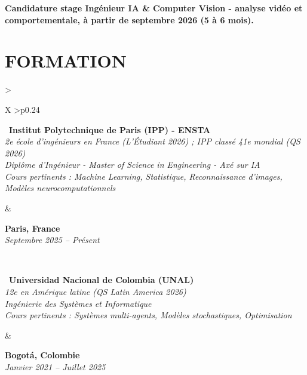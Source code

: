 \documentclass[letterpaper,10pt]{article}
\begin{document}
\textbf{Candidature stage Ingénieur IA \& Computer Vision - analyse vidéo et comportementale, à partir de septembre 2026 (5 à 6 mois).} 


\vspace{-0.05cm}

\section{\textcolor{mydarkgreen}{\textbf{FORMATION}}}

\begin{tabularx}{\textwidth}{>{\raggedright\arraybackslash}X >{\raggedleft\arraybackslash}p{0.24\textwidth}}
  \begin{minipage}[t]{\linewidth}\raggedright
  \textbullet\ \textbf{Institut Polytechnique de Paris (IPP) - ENSTA}\\
  \textit{\footnotesize 2e école d'ingénieurs en France (L'Étudiant 2026) ; IPP classé 41e mondial (QS 2026)}\\
  \textit{\footnotesize Diplôme d'Ingénieur - Master of Science in Engineering - Axé sur IA}\\
  \textit{\footnotesize Cours pertinents : Machine Learning, Statistique, Reconnaissance d'images, Modèles neurocomputationnels}
  \end{minipage}
  &
  \begin{minipage}[t]{\linewidth}\raggedleft
  \textbf{Paris, France}\\
  {\footnotesize\textit{Septembre 2025 -- Présent}}
  \end{minipage}
  \\
  \begin{minipage}[t]{\linewidth}
  \textbullet\ \textbf{Universidad Nacional de Colombia (UNAL)}\\
  \textit{\footnotesize 12e en Amérique latine (QS Latin America 2026)}\\
  \textit{\footnotesize Ingénierie des Systèmes et Informatique}\\
  \textit{\footnotesize Cours pertinents : Systèmes multi-agents, Modèles stochastiques, Optimisation}
  \end{minipage}
  &
  \begin{minipage}[t]{\linewidth}\raggedleft
  \textbf{Bogotá, Colombie}\\
  {\footnotesize\textit{Janvier 2021 -- Juillet 2025}}
  \end{minipage}

\end{tabularx}
\end{document}
